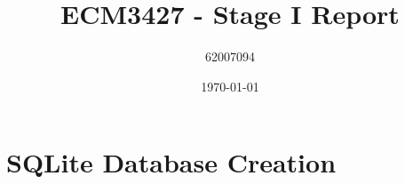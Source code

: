 \documentclass[11pt]{article}
\begin{document}
\title{ECM3427 - Stage I Report}
\author{62007094}
\date{\today}
\maketitle

\section{SQLite Database Creation}
\end{document}
